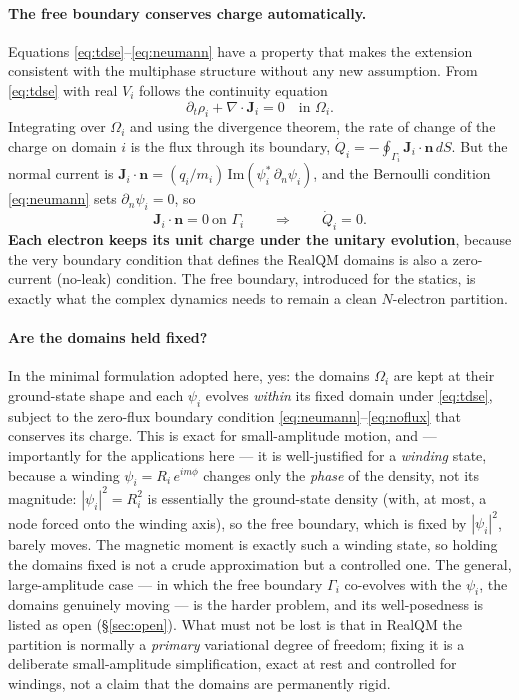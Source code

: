 \documentclass[11pt]{article}
\begin{document}
\paragraph{The free boundary conserves charge automatically.} Equations \eqref{eq:tdse}--\eqref{eq:neumann}
have a property that makes the extension consistent with the multiphase structure without any new
assumption. From \eqref{eq:tdse} with real $V_i$ follows the continuity equation
\begin{equation}
\partial_t\rho_i + \nabla\!\cdot\!\mathbf J_i = 0 \quad\text{in }\Omega_i .
\label{eq:cont}
\end{equation}
Integrating over $\Omega_i$ and using the divergence theorem, the rate of change of the charge on domain
$i$ is the flux through its boundary,
$\dot Q_i = -\oint_{\Gamma_i}\mathbf J_i\!\cdot\!\mathbf n\,dS$. But the normal current is
$\mathbf J_i\!\cdot\!\mathbf n = (q_i/m_i)\,\mathrm{Im}(\psi_i^*\,\partial_n\psi_i)$, and the Bernoulli
condition \eqref{eq:neumann} sets $\partial_n\psi_i=0$, so
\begin{equation}
\mathbf J_i\!\cdot\!\mathbf n = 0 \ \text{on }\Gamma_i
\qquad\Longrightarrow\qquad \dot Q_i = 0 .
\label{eq:noflux}
\end{equation}
\textbf{Each electron keeps its unit charge under the unitary evolution}, because the very boundary
condition that defines the RealQM domains is also a zero-current (no-leak) condition. The free boundary,
introduced for the statics, is exactly what the complex dynamics needs to remain a clean $N$-electron
partition.

\paragraph{Are the domains held fixed?} In the minimal formulation adopted here, yes: the domains
$\Omega_i$ are kept at their ground-state shape and each $\psi_i$ evolves \emph{within} its fixed domain
under \eqref{eq:tdse}, subject to the zero-flux boundary condition \eqref{eq:neumann}--\eqref{eq:noflux}
that conserves its charge. This is exact for small-amplitude motion, and --- importantly for the
applications here --- it is well-justified for a \emph{winding} state, because a winding
$\psi_i = R_i\,e^{im\phi}$ changes only the \emph{phase} of the density, not its magnitude: $|\psi_i|^2 =
R_i^2$ is essentially the ground-state density (with, at most, a node forced onto the winding axis), so
the free boundary, which is fixed by $|\psi_i|^2$, barely moves. The magnetic moment is exactly such a
winding state, so holding the domains fixed is not a crude approximation but a controlled one. The
general, large-amplitude case --- in which the free boundary $\Gamma_i$ co-evolves with the $\psi_i$, the
domains genuinely moving --- is the harder problem, and its well-posedness is listed as open
(\S\ref{sec:open}). What must not be lost is that in RealQM the partition is normally a \emph{primary}
variational degree of freedom; fixing it is a deliberate small-amplitude simplification, exact at rest and
controlled for windings, not a claim that the domains are permanently rigid.
\end{document}
